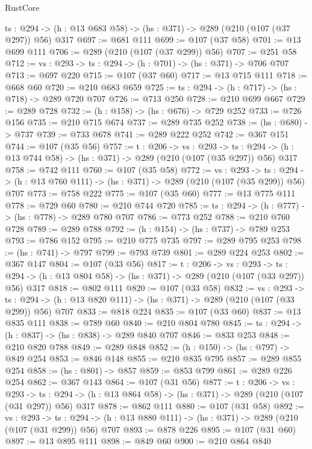 \begin{lexlean}{RustCore}
\begin{coremodule}
  {ts : @294} -> (h : @13 @683 @58) -> (hs : @371) -> @289 (@210 (@107 (@37 @297)) @56) @317
@697 := @681 @111
@699 := @107 (@37 @58)
@701 := @13 @699 @111
@706 := @289 (@210 (@107 (@37 @299)) @56)
@707 := @251 @58
@712 := {vs : @293} -> {ts : @294} -> (h : @701) -> (hs : @371) -> @706 @707
@713 := @697 @220
@715 := @107 (@37 @60)
@717 := @13 @715 @111
@718 := @668 @60
@720 := @210 @683 @659
@725 := {ts : @294} -> (h : @717) -> (hs : @718) -> @289 @720 @707
@726 := @713 @250
@728 := @210 @699 @667
@729 := @289 @728
@732 := (h : @158) -> (hs : @676) -> @729 @252
@733 := @726 @156
@735 := @210 @715 @674
@737 := @289 @735 @252
@738 := (hs : @680) -> @737
@739 := @733 @678
@741 := @289 @222 @252
@742 := @367 @151
@744 := @107 (@35 @56)
@757 := {t : @206} ->
  {vs : @293} ->
  {ts : @294} -> (h : @13 @744 @58) -> (hs : @371) -> @289 (@210 (@107 (@35 @297)) @56) @317
@758 := @742 @111
@760 := @107 (@35 @58)
@772 := {vs : @293} ->
  {ts : @294} -> (h : @13 @760 @111) -> (hs : @371) -> @289 (@210 (@107 (@35 @299)) @56) @707
@773 := @758 @222
@775 := @107 (@35 @60)
@777 := @13 @775 @111
@778 := @729 @60
@780 := @210 @744 @720
@785 := {ts : @294} -> (h : @777) -> (hs : @778) -> @289 @780 @707
@786 := @773 @252
@788 := @210 @760 @728
@789 := @289 @788
@792 := (h : @154) -> (hs : @737) -> @789 @253
@793 := @786 @152
@795 := @210 @775 @735
@797 := @289 @795 @253
@798 := (hs : @741) -> @797
@799 := @793 @739
@801 := @289 @224 @253
@802 := @367 @147
@804 := @107 (@33 @56)
@817 := {t : @206} ->
  {vs : @293} ->
  {ts : @294} -> (h : @13 @804 @58) -> (hs : @371) -> @289 (@210 (@107 (@33 @297)) @56) @317
@818 := @802 @111
@820 := @107 (@33 @58)
@832 := {vs : @293} ->
  {ts : @294} -> (h : @13 @820 @111) -> (hs : @371) -> @289 (@210 (@107 (@33 @299)) @56) @707
@833 := @818 @224
@835 := @107 (@33 @60)
@837 := @13 @835 @111
@838 := @789 @60
@840 := @210 @804 @780
@845 := {ts : @294} -> (h : @837) -> (hs : @838) -> @289 @840 @707
@846 := @833 @253
@848 := @210 @820 @788
@849 := @289 @848
@852 := (h : @150) -> (hs : @797) -> @849 @254
@853 := @846 @148
@855 := @210 @835 @795
@857 := @289 @855 @254
@858 := (hs : @801) -> @857
@859 := @853 @799
@861 := @289 @226 @254
@862 := @367 @143
@864 := @107 (@31 @56)
@877 := {t : @206} ->
  {vs : @293} ->
  {ts : @294} -> (h : @13 @864 @58) -> (hs : @371) -> @289 (@210 (@107 (@31 @297)) @56) @317
@878 := @862 @111
@880 := @107 (@31 @58)
@892 := {vs : @293} ->
  {ts : @294} -> (h : @13 @880 @111) -> (hs : @371) -> @289 (@210 (@107 (@31 @299)) @56) @707
@893 := @878 @226
@895 := @107 (@31 @60)
@897 := @13 @895 @111
@898 := @849 @60
@900 := @210 @864 @840

\end{coremodule}
\end{lexlean}
